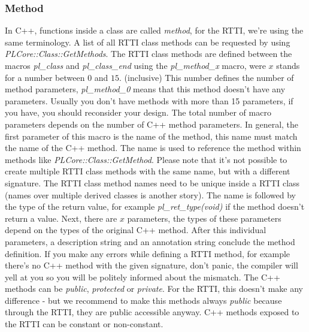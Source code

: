 \subsubsection{Method}
\label{ClassMembers:Method}
In C++, functions inside a class are called \emph{method}, for the \ac{RTTI}, we're using the same terminology. A list of all \ac{RTTI} class methods can be requested by using \emph{PLCore::Class::GetMethods}. The \ac{RTTI} class methods are defined between the macros \emph{pl\_class} and \emph{pl\_class\_end} using the \emph{pl\_method\_x} macro, were $x$ stands for a number between $0$ and $15$. (inclusive) This number defines the number of method parameters, \emph{pl\_method\_0} means that this method doesn't have any parameters. Usually you don't have methods with more than 15 parameters, if you have, you should reconsider your design. The total number of macro parameters depends on the number of C++ method parameters. In general, the first parameter of this macro is the name of the method, this name must match the name of the C++ method. The name is used to reference the method within methods like \emph{PLCore::Class::GetMethod}. Please note that it's not possible to create multiple \ac{RTTI} class methods with the same name, but with a different signature. The \ac{RTTI} class method names need to be unique inside a \ac{RTTI} class (names over multiple derived classes is another story). The name is followed by the type of the return value, for example \emph{pl\_ret\_type(void)} if the method doesn't return a value. Next, there are $x$ parameters, the types of these parameters depend on the types of the original C++ method. After this individual parameters, a description string and an annotation string conclude the method definition. If you make any errors while defining a \ac{RTTI} method, for example there's no C++ method with the given signature, don't panic, the compiler will yell at you so you will be politely informed about the mismatch. The C++ methods can be \emph{public}, \emph{protected} or \emph{private}. For the \ac{RTTI}, this doesn't make any difference - but we recommend to make this methods always \emph{public} because through the \ac{RTTI}, they are public accessible anyway. C++ methods exposed to the \ac{RTTI} can be constant or non-constant.

